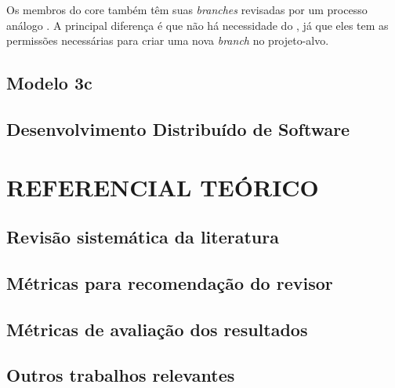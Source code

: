 \documentclass[preprint,review, 12pt]{elsarticle}
\begin{document}
    Os membros do core também têm suas \textit{branches} revisadas por um processo análogo \cite{6385140,Bosu2014}. A principal diferença é que não há necessidade do , já que eles tem as permissões necessárias para criar uma nova \textit{branch} no projeto-alvo.

  \subsection{Modelo 3c}\label{sec:modelo_3c}

  \subsection{Desenvolvimento Distribuído de Software}\label{sec:dds}


\section{REFERENCIAL TEÓRICO}\label{chap:trabalhos_relacionados}

  \subsection{Revisão sistemática da literatura}\label{sec:revisao_sistematica}

  \subsection{Métricas para recomendação do revisor}\label{sec:metricas_revisor}

  \subsection{Métricas de avaliação dos resultados}\label{sec:metricas_resultados}

  \subsection{Outros trabalhos relevantes}\label{sec:outros_trabalhos}
\end{document}
